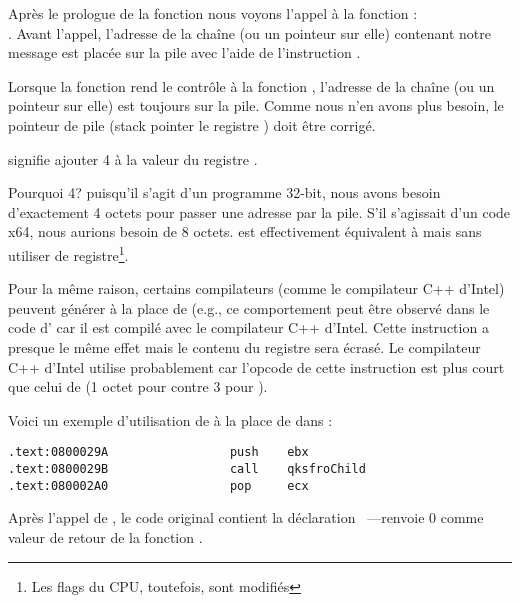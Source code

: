 Après le prologue de la fonction nous voyons l'appel à la fonction \printf{}:\\
.
Avant l'appel, l'adresse de la chaîne (ou un pointeur sur elle) contenant notre message
 est placée sur la pile avec l'aide de l'instruction \PUSH.

Lorsque la fonction \printf rend le contrôle à la fonction \main, l'adresse de la chaîne (ou un pointeur sur elle)
est toujours sur la pile.
Comme nous n'en avons plus besoin, le pointeur de pile (\gls{stack pointer} le registre \ESP) doit être corrigé.

 signifie ajouter 4 à la valeur du registre \ESP.

Pourquoi 4? puisqu'il s'agit d'un programme 32-bit, nous avons besoin d'exactement 4 octets pour passer une adresse
par la pile. S'il s'agissait d'un code x64, nous aurions besoin de 8 octets.
 est effectivement équivalent à  mais sans utiliser de registre\footnote{Les
flags du CPU, toutefois, sont modifiés}.

\myindex{\oracle}

Pour la même raison, certains compilateurs (comme le compilateur C++ d'Intel) peuvent générer 
à la place de \ADD (e.g., ce comportement peut être observé dans le code d'\oracle{} car il est
compilé avec le compilateur C++ d'Intel.
Cette instruction a presque le même effet mais le contenu du registre \ECX sera écrasé.
Le compilateur C++ d'Intel utilise probablement  car l'opcode de cette instruction est plus
 court que celui de  (1 octet pour  contre 3 pour ).

Voici un exemple d'utilisation de \POP à la place de \ADD dans \oracle{}:

\begin{lstlisting}[caption=\oracle 10.2 Linux (app.o file),style=customasmx86]
.text:0800029A                 push    ebx
.text:0800029B                 call    qksfroChild
.text:080002A0                 pop     ecx
\end{lstlisting}


Après l'appel de \printf, le code \CCpp original contient la déclaration ~---renvoie 0 comme valeur de retour de la fonction \main.

